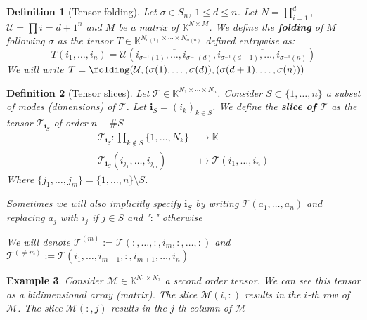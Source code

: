 \documentclass[11pt,a4paper,openright,oneside]{book}
\numberwithin{equation}{section}
\newtheorem{defn0}{Definition}[chapter]
\newtheorem{example0}[defn0]{Example}
\newenvironment{definition}{ \begin{defn0}}{\end{defn0}}
\newenvironment{example}{ \begin{example0}\rm}{\end{example0}}
\begin{document}
\begin{definition}[Tensor folding]
    Let $\sigma \in S_n$, $1 \leqslant d \leqslant n$. Let $N = \prod_{i=1}^d$, $\mathcal{U} = \prod{i=d+1}^n$ and $M$ be a matrix of $\mathbb{K}^{N \times M}$.
    We define the \textbf{folding} of $M$ following $\sigma$ as the tensor $T \in \mathbb{K}^{N_{\sigma(1)} \times \cdots \times N_{\sigma(n)}}$ defined entrywise as:
    $$T(i_1, \dots, i_n) = \mathcal{U}(\overline{i_{\sigma^{-1}(1)}, \dots, i_{\sigma^{-1}(d)}}, \overline{i_{\sigma^{-1}(d+1)}, \dots, i_{\sigma^{-1}(n)}})$$
    We will write $T = \folding(\mathcal{U}, (\sigma(1), \dots, \sigma(d)), (\sigma(d+1), \dots, \sigma(n)))$
\end{definition}


\iffalse
\begin{definition}[Tensor slices]

    Let $\mathcal{T} \in \mathbb{K}^{N_1\times \cdots \times N_n}$. Consider $S \subset \{1, \dots, n\}$ a subset of modes (dimensions)
    of $\mathcal{T}$. Let $\mathbf{i}_S = (i_k)_{k \in S}$. We define the \textbf{slice of $\mathcal{T}$} as the tensor $\mathcal{T}_{\mathbf{i}_S}$
    of order $n - \#S$
    $$\begin{align}
        \mathcal{T}_{\mathbf{i}_S} : \prod_{k \not\in S} \{1, \dots, N_k\} & \longrightarrow \mathbb{K} \\
        \mathcal{T}_{\mathbf{i}_S}(i_{j_1}, \dots, i_{j_m}) & \longmapsto \mathcal{T}(i_1, \dots, i_n)
    \end{align}$$
    Where $\{j_1, \dots, j_m\} = \{1, \dots, n\} \setminus S$. 

    Sometimes we will also implicitly specify $\mathbf{i}_S$ by writing $\mathcal{T}(a_1, \dots, a_n)$ and replacing $a_j$ with $i_j$ if $j \in S$ and "$:$" otherwise

    We will denote $\mathcal{T}^{(m)} := \mathcal{T}(:, \dots, :, i_m, :, \dots, :)$ and $\mathcal{T}^{(\neq m)} := \mathcal{T}(i_1, \dots, i_{m-1}, :, i_{m+1}, \dots, i_n)$
\end{definition}

\begin{example}
    Consider $\mathcal{M} \in \mathbb{K}^{N_1 \times N_2}$ a second order tensor. We can see this tensor as a
    bidimensional array (matrix). The slice $\mathcal{M}(i, :)$ results in the $i$-th row of $\mathcal{M}$.
    The slice $\mathcal{M}(:, j)$ results in the $j$-th column of $\mathcal{M}$
\end{example}
\end{document}
